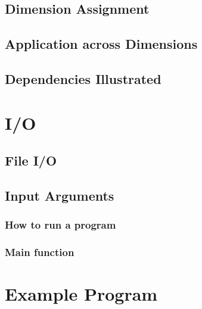 \documentclass[titlepage]{article}
\begin{document}
\subsection{Dimension Assignment}
\subsection{Application across Dimensions}
\subsection{Dependencies Illustrated}
\section{I/O}
\subsection{File I/O}
\subsection{Input Arguments}
\subsubsection{How to run a program}
\subsubsection{Main function}
\section{Example Program}
\end{document}

